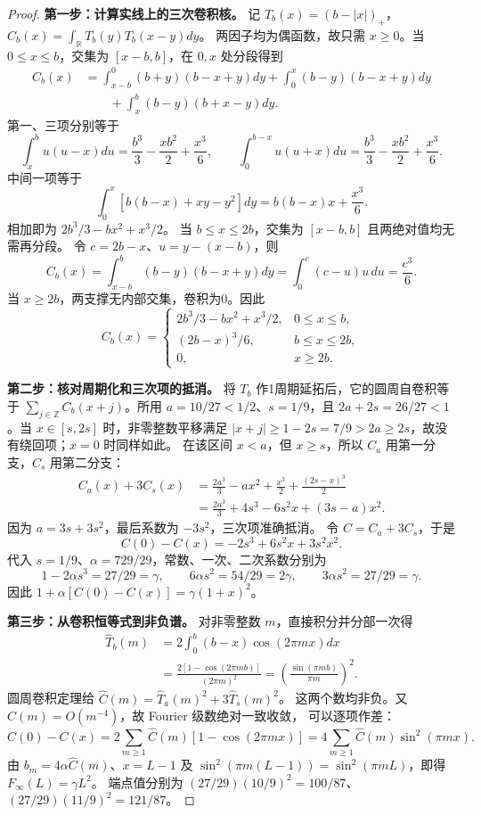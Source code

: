 \begin{proof}
\textbf{第一步：计算实线上的三次卷积核。}
记 $T_b(x)=(b-|x|)_+$，$C_b(x)=\int_{\mathbb R}T_b(y)T_b(x-y)dy$。
两因子均为偶函数，故只需 $x\ge0$。当 $0\le x\le b$，交集为
$[x-b,b]$，在 $0,x$ 处分段得到
\begin{align*}
 C_b(x)&=\int_{x-b}^0(b+y)(b-x+y)dy
 +\int_0^x(b-y)(b-x+y)dy\\
 &\qquad+\int_x^b(b-y)(b+x-y)dy.
\end{align*}
第一、三项分别等于
\[
 \int_x^b u(u-x)du=\frac{b^3}{3}-\frac{xb^2}{2}+\frac{x^3}{6},
 \qquad\int_0^{b-x}u(u+x)du
 =\frac{b^3}{3}-\frac{xb^2}{2}+\frac{x^3}{6}.
\]
中间一项等于
\[
 \int_0^x[b(b-x)+xy-y^2]dy=b(b-x)x+\frac{x^3}{6}.
\]
相加即为 $2b^3/3-bx^2+x^3/2$。
当 $b\le x\le2b$，交集为 $[x-b,b]$ 且两绝对值均无需再分段。
令 $c=2b-x$、$u=y-(x-b)$，则
\[
 C_b(x)=\int_{x-b}^b(b-y)(b-x+y)dy
 =\int_0^c(c-u)u\,du=\frac{c^3}{6}.
\]
当 $x\ge2b$，两支撑无内部交集，卷积为0。因此
\[
 C_b(x)=\begin{cases}
 2b^3/3-bx^2+x^3/2,&0\le x\le b,\\
 (2b-x)^3/6,&b\le x\le2b,\\0,&x\ge2b.
 \end{cases}
\]

\textbf{第二步：核对周期化和三次项的抵消。}
将 $T_b$ 作1周期延拓后，它的圆周自卷积等于
$\sum_{j\in\mathbb Z}C_b(x+j)$。所用 $a=10/27<1/2$、$s=1/9$，且
$2a+2s=26/27<1$。当 $x\in[s,2s]$ 时，非零整数平移满足
$|x+j|\ge1-2s=7/9>2a\ge2s$，故没有绕回项；$x=0$ 时同样如此。
在该区间 $x<a$，但 $x\ge s$，所以 $C_a$ 用第一分支，$C_s$ 用第二分支：
\begin{align*}
 C_a(x)+3C_s(x)
 &=\frac{2a^3}{3}-ax^2+\frac{x^3}{2}
   +\frac{(2s-x)^3}{2}\\
 &=\frac{2a^3}{3}+4s^3-6s^2x+(3s-a)x^2.
\end{align*}
因为 $a=3s+3s^2$，最后系数为 $-3s^2$，三次项准确抵消。
令 $C=C_a+3C_s$，于是
\[
 C(0)-C(x)=-2s^3+6s^2x+3s^2x^2.
\]
代入 $s=1/9$、$\alpha=729/29$，常数、一次、二次系数分别为
\[
 1-2\alpha s^3=27/29=\gamma,\qquad
 6\alpha s^2=54/29=2\gamma,\qquad
 3\alpha s^2=27/29=\gamma.
\]
因此 $1+\alpha[C(0)-C(x)]=\gamma(1+x)^2$。

\textbf{第三步：从卷积恒等式到非负谱。}
对非零整数 $m$，直接积分并分部一次得
\begin{align*}
 \widehat T_b(m)&=2\int_0^b(b-x)\cos(2\pi mx)dx\\
 &=\frac{2[1-\cos(2\pi mb)]}{(2\pi m)^2}
 =\left(\frac{\sin(\pi mb)}{\pi m}\right)^2.
\end{align*}
圆周卷积定理给
$\widehat C(m)=\widehat T_a(m)^2+3\widehat T_s(m)^2$。
这两个数均非负。又 $\widehat C(m)=O(m^{-4})$，故 Fourier 级数绝对一致收敛，
可以逐项作差：
\[
 C(0)-C(x)=2\sum_{m\ge1}\widehat C(m)[1-\cos(2\pi mx)]
 =4\sum_{m\ge1}\widehat C(m)\sin^2(\pi mx).
\]
由 $b_m=4\alpha\widehat C(m)$、$x=L-1$ 及
$\sin^2(\pi m(L-1))=\sin^2(\pi mL)$，即得 $F_\infty(L)=\gamma L^2$。
端点值分别为
$(27/29)(10/9)^2=100/87$、$(27/29)(11/9)^2=121/87$。


\end{proof}
